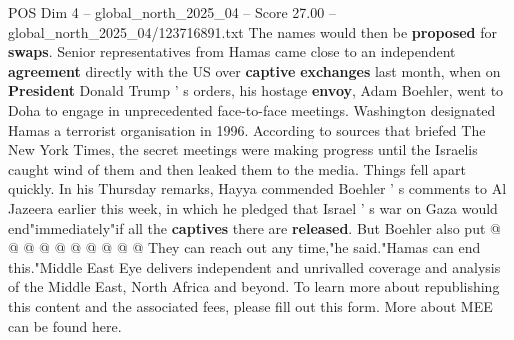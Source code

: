\begin{textsample}{POS Dim 4 – global\_north\_2025\_04 – Score 27.00 – global\_north\_2025\_04/123716891.txt}
The names would then be \textbf{proposed} for \textbf{swaps}.
Senior representatives from Hamas came close to an independent \textbf{agreement} directly with the US over \textbf{captive} \textbf{exchanges} last month, when on \textbf{President} Donald Trump ' s orders, his hostage \textbf{envoy}, Adam Boehler, went to Doha to engage in unprecedented face-to-face meetings.
Washington designated Hamas a terrorist organisation in 1996.
According to sources that briefed The New York Times, the secret meetings were making progress until the Israelis caught wind of them and then leaked them to the media.
Things fell apart quickly.
In his Thursday remarks, Hayya commended Boehler ' s comments to Al Jazeera earlier this week, in which he pledged that Israel ' s war on Gaza would end"immediately"if all the \textbf{captives} there are \textbf{released}.
But Boehler also put @ @ @ @ @ @ @ @ @ @ They can reach out any time,"he said."Hamas can end this."Middle East Eye delivers independent and unrivalled coverage and analysis of the Middle East, North Africa and beyond.
To learn more about republishing this content and the associated fees, please fill out this form.
More about MEE can be found here.

\end{textsample}
